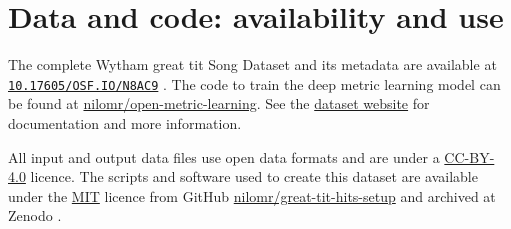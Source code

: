 \section{Data and code: availability and use}

The complete Wytham great tit Song Dataset and its metadata are available at \href{https://osf.io/n8ac9/}{\nolinkurl{10.17605/OSF.IO/N8AC9}} \parencite{nilo_gretidataset_osf_2023}. The code to train the deep metric learning model can be found at \href{https://github.com/nilomr/open-metric-learning/tree/great-tit}{nilomr/open-metric-learning}. See the \href{https://nilomr.github.io/great-tit-hits/}{dataset website} for documentation and more information.

All input and output data files use open data formats and are under a \href{https://creativecommons.org/licenses/by/4.0/}{CC-BY-4.0} licence. The scripts and software used to create this dataset are available under the \href{https://github.com/nilomr/pykanto-example/blob/main/LICENSE}{MIT} licence from GitHub \href{https://github.com/nilomr/great-tit-hits-setup}{nilomr/great-tit-hits-setup} and archived at Zenodo \parencite{nilo_gretidataset_setup_2023}.

\renewcommand{\cleardoublepage}{}
\renewcommand{\clearpage}{}
\printbibliography
